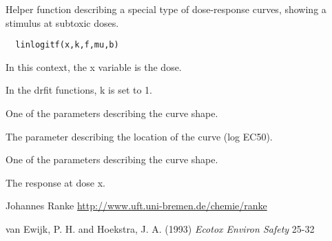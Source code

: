 \begin{Description}\relax
Helper function describing a special type of dose-response curves, showing a stimulus
at subtoxic doses.
\end{Description}
\begin{Usage}
\begin{verbatim}
  linlogitf(x,k,f,mu,b)
\end{verbatim}
\end{Usage}
\begin{Arguments}
\begin{ldescription}
\item[\code{x}] In this context, the x variable is the dose.
\item[\code{k}] In the drfit functions, k is set to 1.
\item[\code{f}] One of the parameters describing the curve shape.
\item[\code{mu}] The parameter describing the location of the curve (log EC50).
\item[\code{b}] One of the parameters describing the curve shape.
\end{ldescription}
\end{Arguments}
\begin{Value}
The response at dose x.
\end{Value}
\begin{Author}\relax
Johannes Ranke 
\url{http://www.uft.uni-bremen.de/chemie/ranke}
\end{Author}
\begin{References}\relax
van Ewijk, P. H. and Hoekstra, J. A. (1993) \emph{Ecotox Environ Safety}
 25-32
\end{References}

